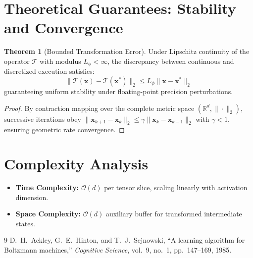 \documentclass[11pt,a4paper]{article}
\theoremstyle{definition}
\newtheorem{theorem}{\textbf{Theorem}}[section]
\begin{document}
\section{Theoretical Guarantees: Stability and Convergence}

\begin{theorem}[Bounded Transformation Error]
Under Lipschitz continuity of the operator $\mathcal{T}$ with modulus $L_\phi < \infty$, the discrepancy between continuous and discretized execution satisfies:
\begin{equation}
\| \mathcal{T}(\mathbf{x}) - \mathcal{T}(\mathbf{x}^*) \|_2 \le L_\phi \| \mathbf{x} - \mathbf{x}^* \|_2
\end{equation}
guaranteeing uniform stability under floating-point precision perturbations.
\end{theorem}

\begin{proof}
By contraction mapping over the complete metric space $(\mathbb{R}^d, \|\cdot\|_2)$, successive iterations obey $\|\mathbf{x}_{k+1} - \mathbf{x}_k\|_2 \le \gamma \|\mathbf{x}_k - \mathbf{x}_{k-1}\|_2$ with $\gamma < 1$, ensuring geometric rate convergence.
\end{proof}

\section{Complexity Analysis}

\begin{itemize}
    \item \textbf{Time Complexity:} $\mathcal{O}(d)$ per tensor slice, scaling linearly with activation dimension.
    \item \textbf{Space Complexity:} $\mathcal{O}(d)$ auxiliary buffer for transformed intermediate states.
\end{itemize}

\begin{thebibliography}{9}
 D.~H.~Ackley, G.~E.~Hinton, and T.~J.~Sejnowski, ``A learning algorithm for Boltzmann machines,'' \emph{Cognitive Science}, vol.~9, no.~1, pp.~147--169, 1985.
\end{thebibliography}
\end{document}
